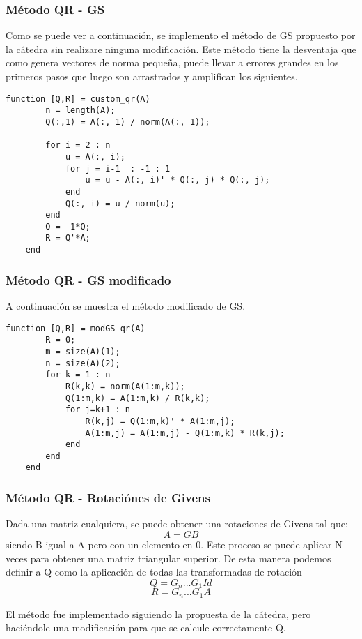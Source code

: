 \documentclass[a4paper,10pt]{article}
\begin{document}
\subsubsection{Método QR - GS}

Como se puede ver a continuación, se implemento el método de GS propuesto por la cátedra sin realizare ninguna modificación. Este método tiene la desventaja que como genera vectores de norma pequeña, puede llevar a errores grandes en los primeros pasos que luego son arrastrados y amplifican los siguientes.

\begin{lstlisting}[caption = Implementación de la descomposición QR con GS]
	function [Q,R] = custom_qr(A)
		n = length(A);
		Q(:,1) = A(:, 1) / norm(A(:, 1));

		for i = 2 : n
			u = A(:, i);
			for j = i-1  : -1 : 1
				u = u - A(:, i)' * Q(:, j) * Q(:, j);
			end
			Q(:, i) = u / norm(u);
		end
		Q = -1*Q;
		R = Q'*A;
	end
\end{lstlisting}
\subsubsection{Método QR - GS modificado}

A continuación se muestra el método modificado de GS.

\begin{lstlisting}[caption = Implementación de la descomposición QR con GS]
	function [Q,R] = modGS_qr(A)
		R = 0;
		m = size(A)(1);
		n = size(A)(2);
		for k = 1 : n
			R(k,k) = norm(A(1:m,k));
			Q(1:m,k) = A(1:m,k) / R(k,k);
			for j=k+1 : n
				R(k,j) = Q(1:m,k)' * A(1:m,j);
				A(1:m,j) = A(1:m,j) - Q(1:m,k) * R(k,j);
			end
		end  
	end
\end{lstlisting}
\subsubsection{Método QR - Rotaciónes de Givens}

Dada una matriz cualquiera, se puede obtener una rotaciones de Givens tal que: \[  A=G B  \] siendo B igual a A pero con un elemento en 0. Este proceso se puede aplicar N veces para obtener una matriz triangular superior.
De esta manera podemos definir a Q como la aplicación de todas las transformadas de rotación \[ Q = G_n ... G_1  Id  \] \[ R = G_n ... G_1  A  \]

El método fue implementado siguiendo la propuesta de la cátedra, pero haciéndole una modificación para que se calcule correctamente Q.
\end{document}
